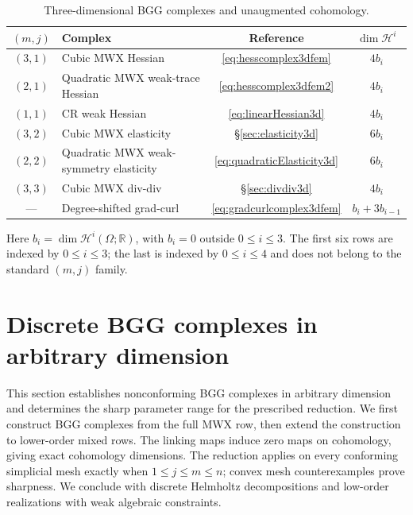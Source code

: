 \documentclass[10pt]{amsart}
\numberwithin{equation}{section}
\begin{document}
\begin{table}[!htbp]
\centering
\caption{Three-dimensional BGG complexes and unaugmented cohomology.}
\label{tab:BGG3dSummary}
\small
\begin{tabularx}{\textwidth}{@{}cXcc@{}}
\toprule
$(m,j)$ & Complex & Reference & $\dim \mathscr H^i$ \\
\midrule
$(3,1)$ & Cubic MWX Hessian
& \eqref{eq:hesscomplex3dfem} & $4b_i$ \\
$(2,1)$ & Quadratic MWX weak-trace Hessian
& \eqref{eq:hesscomplex3dfem2} & $4b_i$ \\
$(1,1)$ & CR weak Hessian
& \eqref{eq:linearHessian3d} & $4b_i$ \\
$(3,2)$ & Cubic MWX elasticity
& \S\ref{sec:elasticity3d} & $6b_i$ \\
$(2,2)$ & Quadratic MWX weak-symmetry elasticity
& \eqref{eq:quadraticElasticity3d} & $6b_i$ \\
$(3,3)$ & Cubic MWX div-div
& \S\ref{sec:divdiv3d} & $4b_i$ \\
\midrule
--- & Degree-shifted grad-curl
& \eqref{eq:gradcurlcomplex3dfem} & $b_i+3b_{i-1}$ \\
\bottomrule
\end{tabularx}
\smallskip

\begin{minipage}{\textwidth}
\footnotesize
Here $b_i=\dim \mathscr H^i(\Omega;\mathbb R)$, with $b_i=0$ outside
$0\leq i\leq3$. The first six rows are indexed by $0\leq i\leq3$;
the last is indexed by $0\leq i\leq4$ and does not belong to the
standard $(m,j)$ family.
\end{minipage}
\end{table}

\FloatBarrier
\section{Discrete BGG complexes in arbitrary dimension}\label{sec:BGGArbitrary}

This section establishes nonconforming BGG complexes in arbitrary
dimension and determines the sharp parameter range for the prescribed
reduction. We first construct BGG complexes from the full MWX row, then
extend the construction to lower-order mixed rows. The linking maps induce zero maps on
cohomology, giving exact cohomology dimensions. The reduction applies on
every conforming simplicial mesh exactly when $1\leq j\leq m\leq n$;
convex mesh counterexamples prove sharpness. We conclude with discrete
Helmholtz decompositions and low-order realizations with weak algebraic
constraints.
\end{document}
